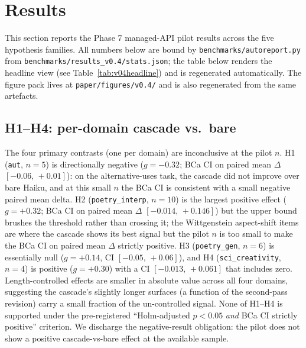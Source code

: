 \section{Results}\label{sec:results}

\sloppy

This section reports the Phase 7 managed-API pilot results across the five hypothesis families. All numbers below are bound by \texttt{benchmarks/autoreport.py} from \nolinkurl{benchmarks/results_v0.4/stats.json}; the table below renders the headline view (see Table~\ref{tab:v04headline}) and is regenerated automatically. The figure pack lives at \nolinkurl{paper/figures/v0.4/} and is also regenerated from the same artefacts.

\begin{table}[ht]
\centering
\caption{Headline result summary. ``$g$'' is Hedges' $g$ with small-sample correction; ``BCa CI'' is a 10,000-resample bias-corrected and accelerated bootstrap interval on the paired mean $\Delta$; ``perm.~$p$'' is a one-sided paired permutation $p$-value (exact for $n\le 18$); ``Holm~$p$'' is the Holm--Bonferroni-adjusted family-wise $p$ across $\{H_1,\ldots,H_4\}$. ``supported'' requires both Holm~$p<0.05$ \emph{and} a strictly positive BCa CI on the paired mean $\Delta$.}
\label{tab:v04headline}

\end{table}

\subsection{H1--H4: per-domain cascade vs.\ bare}\label{sec:results_h1_h4}

The four primary contrasts (one per domain) are inconclusive at the pilot $n$. H1 (\texttt{aut}, $n=5$) is directionally negative ($g=-0.32$; BCa CI on paired mean $\Delta$ $[-0.06,\,+0.01]$): on the alternative-uses task, the cascade did not improve over bare Haiku, and at this small $n$ the BCa CI is consistent with a small negative paired mean delta. H2 (\texttt{poetry\_interp}, $n=10$) is the largest positive effect ($g=+0.32$; BCa CI on paired mean $\Delta$ $[-0.014,\,+0.146]$) but the upper bound brushes the threshold rather than crossing it; the Wittgenstein aspect-shift items are where the cascade shows its best signal but the pilot $n$ is too small to make the BCa CI on paired mean $\Delta$ strictly positive. H3 (\texttt{poetry\_gen}, $n=6$) is essentially null ($g=+0.14$, CI $[-0.05,\,+0.06]$), and H4 (\texttt{sci\_creativity}, $n=4$) is positive ($g=+0.30$) with a CI $[-0.013,\,+0.061]$ that includes zero. Length-controlled effects are smaller in absolute value across all four domains, suggesting the cascade's slightly longer surfaces (a function of the second-pass revision) carry a small fraction of the un-controlled signal. None of H1--H4 is supported under the pre-registered ``Holm-adjusted $p<0.05$ \emph{and} BCa CI strictly positive'' criterion. We discharge the negative-result obligation: the pilot does not show a positive cascade-vs-bare effect at the available sample.

